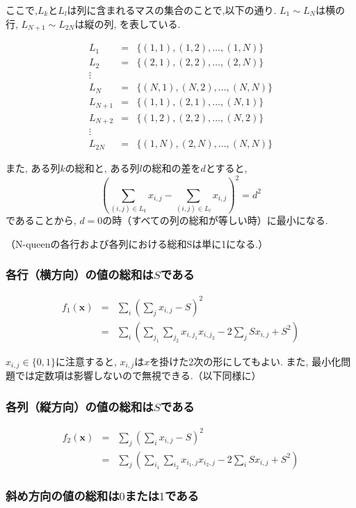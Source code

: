 \documentclass[uplatex,dvipdfmx,a4paper,11pt,oneside,openany]{jsbook}
\begin{document}
ここで,$L_k$と$L_l$は列に含まれるマスの集合のことで,以下の通り. $L_1 \sim L_{N}$は横の行, $L_{N+1} \sim L_{2N}$は縦の列, を表している.

\begin{eqnarray*}
L_1 &=& \{(1,1),(1,2),\dots,(1,N)\}\\
L_2 &=& \{(2,1),(2,2),\dots,(2,N)\}\\
\vdots\\
L_{N} &=& \{(N,1),(N,2),\dots,(N,N)\}\\
L_{N+1} &=& \{(1,1),(2,1),\dots,(N,1)\}\\
L_{N+2} &=& \{(1,2),(2,2),\dots,(N,2)\}\\
\vdots\\
L_{2N} &=& \{(1,N),(2,N),\dots,(N,N)\}
\end{eqnarray*}

また, ある列$k$の総和と, ある列$l$の総和の差を$d$とすると,
\[
\left(\sum_{(i,j)\in L_{k}} x_{i,j} - \sum_{(i,j)\in L_{l}}x_{i,j} \right)^2 = d^2
\]
であることから, $d=0$の時（すべての列の総和が等しい時）に最小になる.

（N-queenの各行および各列における総和Sは単に1になる.）

\subsubsection{各行（横方向）の値の総和は$S$である}

\begin{eqnarray*}
f_1(\bm{x})&=&\sum_i\left(\sum_jx_{i,j}-S\right)^2\\
&=&\sum_i\left(\sum_{j_1}\sum_{j_2}x_{i,j_1}x_{i,j_2} - 2 \sum_j S x_{i,j} + S^2\right)
\end{eqnarray*}

$x_{i,j}\in \{0,1\}$に注意すると, $x_{i,j}$は$x$を掛けた2次の形にしてもよい. また,
最小化問題では定数項は影響しないので無視できる.（以下同様に）

\subsubsection{各列（縦方向）の値の総和は$S$である}

\begin{eqnarray*}
f_2(\bm{x})&=&\sum_j\left(\sum_i x_{i,j}-S\right)^2\\
&=&\sum_j\left(\sum_{i_1}\sum_{i_2}x_{i_1,j}x_{i_2,j} - 2 \sum_i S x_{i,j} + S^2\right)
\end{eqnarray*}

\subsubsection{斜め方向の値の総和は$0$または$1$である}
\end{document}
